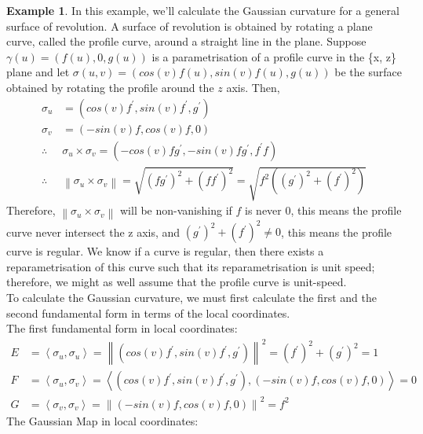 \documentclass{article}
\theoremstyle{plain}
\theoremstyle{definition}
\newtheorem{example}{Example}
\theoremstyle{remark}
\begin{document}
\begin{example}
    In this example, we'll calculate the Gaussian curvature for a general surface of revolution. A surface of revolution is obtained by rotating a plane curve, called the profile curve, around a straight line in the plane. Suppose \( \gamma(u) = (f(u),0,g(u))\) is a parametrisation of a profile curve in the \{x, z\} plane and let \( \sigma(u,v) = (cos(v)f(u), sin(v)f(u), g(u) )\) be the surface obtained by rotating the profile around the \(z\) axis. Then, 
    \begin{align*}
        \sigma_u & = (cos(v)f^{\prime}, sin(v)f^{\prime}, g^{\prime} ) \\
        \sigma_v & = (-sin(v)f, cos(v)f, 0) \\
        \therefore \; \; & \sigma_u \times \sigma_v = (-cos(v)fg^{\prime} , -sin(v)fg^{\prime}, f^{\prime} f) \\
        \therefore \; \; &  \left\lVert\sigma_u \times \sigma_v \right\rVert = \sqrt{(fg^{\prime})^2 + (ff^{\prime})^2} = \sqrt{f^2((g^{\prime})^2 + (f^{\prime})^2)}
    \end{align*} 
    Therefore, \( \left\lVert\sigma_u \times \sigma_v \right\rVert \) will be non-vanishing if \( f \) is never \(0\), this means the profile curve never intersect the z axis, and \(  (g^{\prime})^2 + (f^{\prime})^2 \neq 0 \), this means the profile curve is regular. We know if a curve is regular, then there exists a reparametrisation of this curve such that its reparametrisation is unit speed; therefore, we might as well assume that the profile curve is unit-speed. \\
    To calculate the Gaussian curvature, we must first calculate the first and the second fundamental form in terms of the local coordinates. \\
    The first fundamental form in local coordinates: 
    \begin{align*}
        E & = \left\langle \sigma_u , \sigma_u\right\rangle  = \left\lVert (cos(v)f^{\prime}, sin(v)f^{\prime}, g^{\prime} ) \right\rVert^2 = (f^{\prime})^2 + (g^{\prime})^2  = 1 \\
        F & = \left\langle \sigma_u, \sigma_v \right\rangle = \left\langle (cos(v)f^{\prime}, sin(v)f^{\prime}, g^{\prime} ), (-sin(v)f, cos(v)f, 0 ) \right\rangle = 0 \\
        G & = \left\langle \sigma_v, \sigma_v \right\rangle  = \left\lVert (-sin(v)f, cos(v)f, 0) \right\rVert ^2 = f^2
    \end{align*}
    The Gaussian Map in local coordinates:

\end{example}
\end{document}
